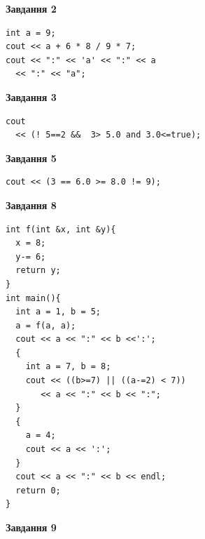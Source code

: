 \documentclass[12pt, ukrainian]{article}
\begin{document}
{\begin {large}
\begin{minipage}[t]{7.0cm}
\end{minipage}
\vline \hspace{1mm}
\begin{minipage}[t]{11.0cm}

\begin{center}
\textbf{Завдання 2}
\end{center}
\vspace{-8mm}

\begin{verbatim}
int a = 9;
cout << a + 6 * 8 / 9 * 7;
cout << ":" << 'a' << ":" << a 
  << ":" << "a";
\end{verbatim}



\begin{center}
\textbf{Завдання 3}
\end{center}
\vspace{-8mm}

\begin{verbatim}
cout 
  << (! 5==2 &&  3> 5.0 and 3.0<=true);
\end{verbatim}



\begin{center}
\textbf{Завдання 5}
\end{center}
\vspace{-8mm}

\begin{verbatim}
cout << (3 == 6.0 >= 8.0 != 9);
\end{verbatim}



\begin{center}
\textbf{Завдання 8}
\end{center}
\vspace{-8mm}

\begin{verbatim}
int f(int &x, int &y){
  x = 8;
  y-= 6;
  return y;
}
int main(){
  int a = 1, b = 5;
  a = f(a, a);
  cout << a << ":" << b <<':';
  {
    int a = 7, b = 8;
    cout << ((b>=7) || ((a-=2) < 7))
       << a << ":" << b << ":";
  }
  {
    a = 4;
    cout << a << ':';
  }
  cout << a << ":" << b << endl;
  return 0;
}
\end{verbatim}

\end{minipage}


\begin{minipage}[t]{7.0cm}

\begin{center}
\textbf{Завдання 9}
\end{center}
\vspace{-8mm}


\end{minipage}
\end{large}}
\end{document}
